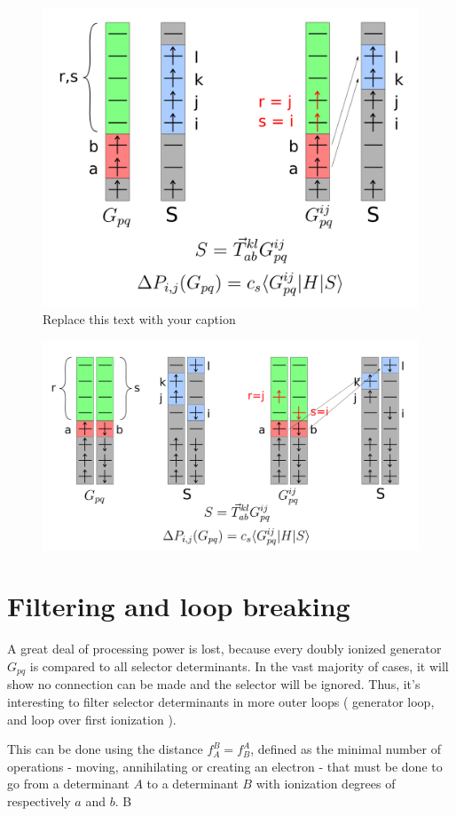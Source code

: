 \documentclass[./thesis.tex]{subfiles}
\begin{document}
\begin{figure}[h!]
	\begin{center}
		\includegraphics[width=0.70\columnwidth]{figures/cipsi/systematic_determination}
		\caption{{Replace this text with your caption%
		}}
	\end{center}
\end{figure}
\begin{figure}[h!]
	\begin{center}
		\includegraphics[width=0.70\columnwidth]{figures/cipsi/systematic_determination2}
		\caption{{\label{splash}%
		}}
	\end{center}
\end{figure}

\section{Filtering and loop breaking}
A great deal of processing power is lost, because every doubly ionized generator $G_{pq}$ is compared to all selector determinants. In the vast majority of cases, it will show no connection can be made and the selector will be ignored. Thus, it's interesting to filter selector determinants in more outer loops ( generator loop, and loop over first ionization ).

This can be done using the distance $f_A^B = f_B^A$, defined as the minimal number of operations - moving, annihilating or creating an electron - that must be done to go from a determinant $A$ to a determinant $B$ with ionization degrees of respectively $a$ and $b$. B
\end{document}
